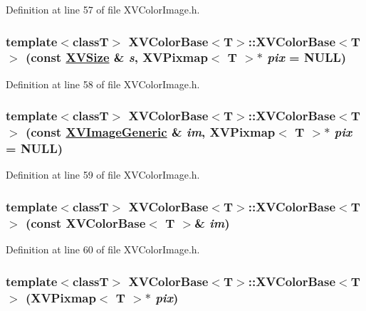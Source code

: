 Definition at line 57 of file XVColor\-Image.h.\label{XVColorBase_a1}
\hypertarget{class_XVColorBase_a1}{
\subsubsection[XVColorBase]{\setlength{\rightskip}{0pt plus 5cm}template$<$classT$>$ XVColor\-Base$<$T$>$::XVColor\-Base$<$T$>$ (const \hyperlink{class_XVSize}{XVSize} \& {\em s}, XVPixmap$<$ T $>$$\ast$ {\em pix} = NULL)}}




Definition at line 58 of file XVColor\-Image.h.\label{XVColorBase_a2}
\hypertarget{class_XVColorBase_a2}{
\subsubsection[XVColorBase]{\setlength{\rightskip}{0pt plus 5cm}template$<$classT$>$ XVColor\-Base$<$T$>$::XVColor\-Base$<$T$>$ (const \hyperlink{class_XVImageGeneric}{XVImage\-Generic} \& {\em im}, XVPixmap$<$ T $>$$\ast$ {\em pix} = NULL)}}




Definition at line 59 of file XVColor\-Image.h.\label{XVColorBase_a3}
\hypertarget{class_XVColorBase_a3}{
\subsubsection[XVColorBase]{\setlength{\rightskip}{0pt plus 5cm}template$<$classT$>$ XVColor\-Base$<$T$>$::XVColor\-Base$<$T$>$ (const XVColor\-Base$<$ T $>$\& {\em im})}}




Definition at line 60 of file XVColor\-Image.h.\label{XVColorBase_a4}
\hypertarget{class_XVColorBase_a4}{
\subsubsection[XVColorBase]{\setlength{\rightskip}{0pt plus 5cm}template$<$classT$>$ XVColor\-Base$<$T$>$::XVColor\-Base$<$T$>$ (XVPixmap$<$ T $>$$\ast$ {\em pix})}}




